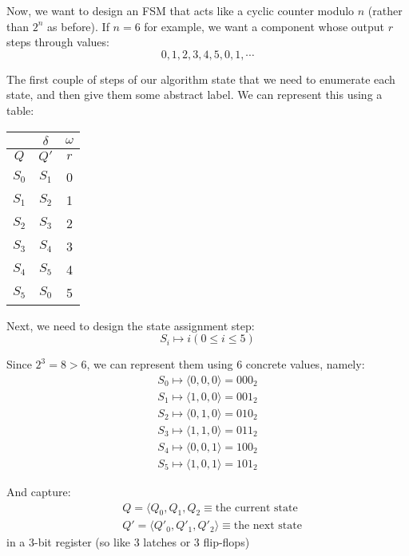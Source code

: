 \documentclass[11pt,a4paper,titlepage,dvipsnames,cmyk]{scrartcl}
\begin{document}
Now, we want to design an FSM that acts like a cyclic counter modulo $n$
(rather than $2^n$ as before). If $n = 6$ for example, we want a component
whose output $r$ steps through values:
\begin{equation*}
    0, 1, 2, 3, 4, 5, 0, 1, \cdots
\end{equation*}

The first couple of steps of our algorithm state that we need to
enumerate each state, and then give them some abstract label. We can
represent this using a table:

\begin{center}
    \begin{tabular}{|c|c|c|}
        \hline
        & $\delta$ & $\omega$ \\ \hline
        $Q$ & $Q'$ & $r$ \\ \hline
        $S_0$ & $S_1$ & 0 \\ \hline
        $S_1$ & $S_2$ & 1 \\ \hline
        $S_2$ & $S_3$ & 2 \\ \hline
        $S_3$ & $S_4$ & 3 \\ \hline
        $S_4$ & $S_5$ & 4 \\ \hline
        $S_5$ & $S_0$ & 5 \\ \hline
    \end{tabular}
\end{center}

Next, we need to design the state assignment step:
\begin{equation*}
    S_i \mapsto i (0 \le i \le 5)
\end{equation*}

Since $2^3 = 8 > 6$, we can represent them using 6 concrete values,
namely:
\begin{align*}
    S_0 \mapsto \langle 0, 0, 0 \rangle = 000_{2}\\
    S_1 \mapsto \langle 1, 0, 0 \rangle = 001_{2} \\
    S_2 \mapsto \langle 0, 1, 0 \rangle = 010_{2} \\
    S_3 \mapsto \langle 1, 1, 0 \rangle = 011_{2} \\
    S_4 \mapsto \langle 0, 0, 1 \rangle = 100_{2} \\
    S_5 \mapsto \langle 1, 0, 1 \rangle = 101_{2} 
\end{align*}

And capture:
\begin{align*}
    &Q = \langle Q_0, Q_1, Q_2 \equiv \text{the current state} \\
    &Q' = \langle Q'_0, Q'_1, Q'_2 \rangle \equiv \text{the next state}
\end{align*}
in a 3-bit register (so like 3 latches or 3 flip-flops)
\end{document}

